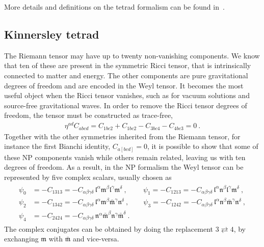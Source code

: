 More details and definitions on the tetrad formalism can be found in~.

\subsection{Kinnersley tetrad}

The Riemann tensor may have up to twenty non-vanishing components.
We know that ten of these are present in the symmetric Ricci tensor, that is intrinsically connected to matter and energy.
The other components are pure gravitational degrees of freedom and are encoded in the Weyl tensor.
It becomes the most useful object when the Ricci tensor vanishes, such as for vacuum solutions and source-free gravitational waves.
In order to remove the Ricci tensor degrees of freedom, the tensor must be constructed as trace-free,
\begin{align}
    \eta^{ad} C_{abcd} = C_{1bc2} + C_{1bc2} - C_{3bc4} - C_{4bc3} = 0 ~. 
\end{align}
Together with the other symmetries inherited from the Riemann tensor, for instance the first Bianchi identity, $C_{a[bcd]}=0$, it is possible to show that some of these NP components vanish while others remain related, leaving us with ten degrees of freedom.
As a result, in the NP formalism the Weyl tensor can be represented by five complex scalars, usually chosen as
\begin{align}
    \begin{split}
        \psi_0 &= - C_{1313} = - C_{\alpha\beta\gamma\delta}\, \mathfrak{l}^\alpha \mathfrak{m}^\beta \mathfrak{l}^\gamma \mathfrak{m}^\delta ~,\qquad
        ~\psi_1 = - C_{1213} = - C_{\alpha\beta\gamma\delta}\, \mathfrak{l}^\alpha \mathfrak{n}^\beta \mathfrak{l}^\gamma \mathfrak{m}^\delta ~,\\
        \psi_2 &= - C_{1342} = - C_{\alpha\beta\gamma\delta}\, \mathfrak{l}^\alpha \mathfrak{m}^\beta \bar{\mathfrak{m}}^\gamma \mathfrak{n}^\delta ~,\qquad
        \psi_3 = - C_{1242} = - C_{\alpha\beta\gamma\delta}\, \mathfrak{l}^\alpha \mathfrak{n}^\beta \bar{\mathfrak{m}}^\gamma \mathfrak{n}^\delta ~,\\
        \psi_4 &= - C_{2424} = - C_{\alpha\beta\gamma\delta}\, \mathfrak{n}^\alpha \bar{\mathfrak{m}}^\beta \mathfrak{n}^\gamma \bar{\mathfrak{m}}^\delta ~.
    \end{split}
\end{align}
The complex conjugates can be obtained by doing the replacement $3 \rightleftarrows 4$, by exchanging $\bm{\mathfrak{m}}$ with $\bar{\bm{\mathfrak{m}}}$ and vice-versa. 
